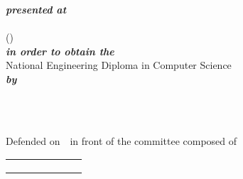 \begin{titlepage}
\begin{center}
\vspace{30pt}%
\textbf{\textit{presented at}}\\

\vspace{10pt}
\ENIS{}\\
(\studyDepartment)\\

\vspace{30pt}
\textbf{\textit{in order to obtain the}}\\

\vspace{10pt}
National Engineering Diploma in Computer Science\\

\vspace{30pt}
\textbf{\textit{by}}\\
\vspace{10pt} {%
  \fontsize{18pt}{18pt}\selectfont%
  \textbf{\reportAuthor}\\
}%

\vspace{10pt} {%
  \renewcommand*{\familydefault}{\defaultFont}
  \fontsize{27pt}{27pt}\selectfont%
  \HRule%
  \vspace{10pt}
  \reportSubject{}\\%
  \vspace{10pt}
  \HRule%
}

\vspace{10pt}
Defended on~\dateSoutenance~in front of the committee composed of\\
\vspace{20pt}
\begin{tabular}{p{0.3\linewidth} p{0.15\linewidth}}
  \juryPresident{} & \juryPresidentDesc{}\\
  \juryMemberOne{} & \juryMemberOneDesc{}\\
  \juryMemberTwo{} & \juryMemberTwoDesc{}\\
\end{tabular}

\vfill

\end{center}
\end{titlepage}